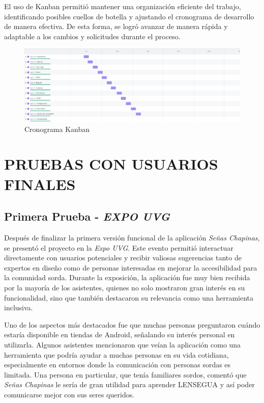 El uso de Kanban permitió mantener una organización eficiente del trabajo, identificando posibles cuellos de botella y ajustando el cronograma de desarrollo de manera efectiva. De esta forma, se logró avanzar de manera rápida y adaptable a los cambios y solicitudes durante el proceso.

\begin{figure} [H]
    \centering
    \includegraphics[width=1\linewidth]{figuras/kanban.png}
    \caption{Cronograma Kanban}
    \label{fig:enter-label}
\end{figure}




\section{PRUEBAS CON USUARIOS FINALES}


\subsection{Primera Prueba - \textit{EXPO UVG}}

Después de finalizar la primera versión funcional de la aplicación \textit{Señas Chapinas}, se presentó el proyecto en la \textit{Expo UVG}. Este evento permitió interactuar directamente con usuarios potenciales y recibir valiosas sugerencias tanto de expertos en diseño como de personas interesadas en mejorar la accesibilidad para la comunidad sorda. Durante la exposición, la aplicación fue muy bien recibida por la mayoría de los asistentes, quienes no solo mostraron gran interés en su funcionalidad, sino que también destacaron su relevancia como una herramienta inclusiva.

Uno de los aspectos más destacados fue que muchas personas preguntaron cuándo estaría disponible en tiendas de Android, señalando su interés personal en utilizarla. Algunos asistentes mencionaron que veían la aplicación como una herramienta que podría ayudar a muchas personas en su vida cotidiana, especialmente en entornos donde la comunicación con personas sordas es limitada. Una persona en particular, que tenía familiares sordos, comentó que \textit{Señas Chapinas} le sería de gran utilidad para aprender LENSEGUA y así poder comunicarse mejor con sus seres queridos.

